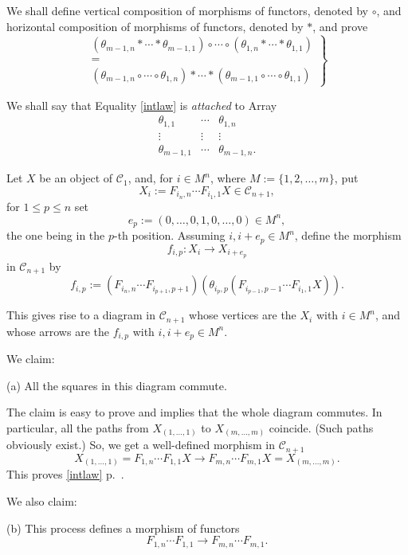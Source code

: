 \documentclass[12pt]{article}
\theoremstyle{remark}
\theoremstyle{definition}
\newcommand{\C}{\mathcal C}
\begin{document}
We shall define vertical composition of morphisms of functors, denoted by $\circ$, and horizontal composition of morphisms of functors, denoted by $*$, and prove 
%
\begin{equation}\label{intlaw}
\left.
\begin{matrix}
(\theta_{m-1,n}*\cdots*\theta_{m-1,1})\circ\cdots\circ(\theta_{1,n}*\cdots*\theta_{1,1})\\ 
=\\ 
(\theta_{m-1,n}\circ\cdots\circ\theta_{1,n})*\cdots*(\theta_{m-1,1}\circ\cdots\circ\theta_{1,1})
\end{matrix}
\right\}
\end{equation}

We shall say that Equality \eqref{intlaw} is {\em attached} to Array
\begin{equation}\label{intlaw2}
\begin{matrix}
\theta_{1,1}&\cdots&\theta_{1,n}\\
\vdots&\vdots&\vdots\\ 
\theta_{m-1,1}&\cdots&\theta_{m-1,n}.
\end{matrix}
\end{equation}

Let $X$ be an object of $\C_1$, and, for $i\in M^n$, where $M:=\{1,2,\dots,m\}$, put 
$$
X_i:=F_{i_n,n}\cdots F_{i_1,1}X\in\C_{n+1},
$$
for $1\le p\le n$ set 
$$
e_p:=(0,\dots,0,1,0,\dots,0)\in M^n,
$$
the one being in the $p$-th position. Assuming $i,i+e_p\in M^n$, define the morphism 
$$
f_{i,p}:X_i\to X_{i+e_p}
$$
in $\C_{n+1}$ by 
$$
f_{i,p}:=(F_{i_n,n}\cdots F_{i_{p+1},p+1})(\theta_{i_p,p}(F_{i_{p-1},p-1}\cdots F_{i_1,1}X)).
$$

This gives rise to a diagram in $\C_{n+1}$ whose vertices are the $X_i$ with $i\in M^n$, and whose arrows are the $f_{i,p}$ with $i,i+e_p\in M^n$. 

We claim: 

\noindent(a) All the squares in this diagram commute. 

The claim is easy to prove and implies that the whole diagram commutes. In particular, all the paths from $X_{(1,\dots,1)}$ to $X_{(m,\dots,m)}$ coincide. (Such paths obviously exist.) So, we get a well-defined morphism in $\C_{n+1}$
$$
X_{(1,\dots,1)}=F_{1,n}\cdots F_{1,1}X\to F_{m,n}\cdots F_{m,1}X=X_{(m,\dots,m)}.
$$
This proves \eqref{intlaw} p.~\pageref{intlaw}.

We also claim: 

\noindent(b) This process defines a morphism of functors 
$$
F_{1,n}\cdots F_{1,1}\to F_{m,n}\cdots F_{m,1}.
$$
\end{document}
